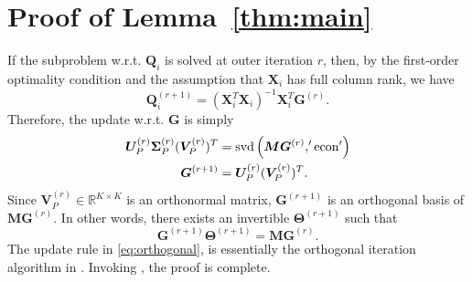 \documentclass[10pt,journal]{IEEEtran}
\newcommand{\G}{\boldsymbol{G}}
\newcommand{\Q}{\boldsymbol{Q}}
\begin{document}
\section{Proof of Lemma~\ref{thm:main}}
If the subproblem w.r.t. ${\bm Q}_i$ is solved at outer iteration $r$,
then, by the first-order optimality condition and the assumption that ${\bm X}_i$ has full column rank, we have
\begin{equation}\label{eq:Qr1}
{\bm Q}_i^{(r+1)}=({\bm X}_i^T{\bm X}_i)^{-1}{\bm X}_i^T{\bm G}^{(r)}.
\end{equation}
Therefore, the update w.r.t. ${\bm G}$ is simply
\begin{subequations}\label{eq:MG}
\begin{align}
{\bm U}_P^{(r)}{\bm \Sigma}_P^{(r)}({\bm V}_P^{(r)})^T&={\rm svd}\left({\bm M}{\bm G}^{(r)},'{\rm econ}'\right) \label{eq:svd}\\
{\bm G}^{(r+1)}& = {\bm U}_P^{(r)}({\bm V}_P^{(r)})^T.
\end{align}
\end{subequations}
Since ${\bm V}_P^{(r)}\in\mathbb{R}^{K\times K}$ is an orthonormal matrix,
${\bm G}^{(r+1)}$ is an orthogonal basis of ${\bm M}{\bm G}^{(r)}$. In other words, there exists an invertible ${\bm \Theta}^{(r+1)}$ such that
\begin{equation}\label{eq:orthogonal}
  {\bm G}^{(r+1)}{\bm \Theta}^{(r+1)} = {\bm M}{\bm G}^{(r)}.
\end{equation}
The update rule in \eqref{eq:orthogonal}, is essentially the orthogonal iteration algorithm in \cite{GHGolub1996}.
Invoking \cite[Theorem 8.2.2]{GHGolub1996}, the proof is complete.
\end{document}

